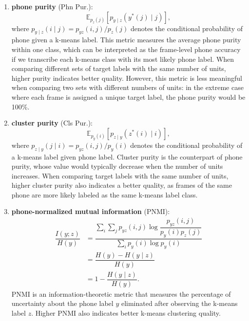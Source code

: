 \begin{enumerate}
    \item \textbf{phone purity} (Phn Pur.): 
    \begin{equation}
        \mathbb{E}_{p_z(j)} [ p_{y \mid z}(y^*(j) \mid j) ],
    \end{equation}
    where $p_{y \mid z}(i \mid j) = p_{yz}(i, j) / p_z(j)$ denotes the conditional probability of phone given a k-means label. This metric measures the average phone purity within one class, which can be interpreted as the frame-level phone accuracy if we transcribe each k-means class with its most likely phone label. When comparing different sets of target labels with the same number of units, higher purity indicates better quality. However, this metric is less meaningful when comparing two sets with different numbers of units: in the extreme case where each frame is assigned a unique target label, the phone purity would be 100\%.

    \item \textbf{cluster purity} (Cls Pur.):
    \begin{equation}
        \mathbb{E}_{p_y(i)} [ p_{z \mid y}(z^*(i) \mid i) ],
    \end{equation}
    where $p_{z \mid y}(j \mid i) = p_{yz}(i, j) / p_y(i)$ denotes the conditional probability of a k-means label given phone label. Cluster purity is the counterpart of phone purity, whose value would typically decrease when the number of units increases. When comparing target labels with the same number of units, higher cluster purity also indicates a better quality, as frames of the same phone are more likely labeled as the same k-means label class.

    \item \textbf{phone-normalized mutual information} (PNMI):
    \begin{align}
        \dfrac{I(y; z)}{H(y)} &= \dfrac{ 
            \sum_i \sum_j p_{yz}(i, j) \log \dfrac{p_{yz}(i, j)}{p_{y}(i)p_{z}(j)} }{
            \sum_i p_{y}(i) \log p_{y}(i) } \\
        &= \dfrac{H(y) - H(y \mid z)} {H(y)} \\
        &= 1 - \dfrac{H(y \mid z)} {H(y)}.
    \end{align}
    PNMI is an information-theoretic metric that measures the percentage of uncertainty about the phone label $y$ eliminated after observing the k-means label $z$. Higher PNMI also indicates better k-means clustering quality.
\end{enumerate}


